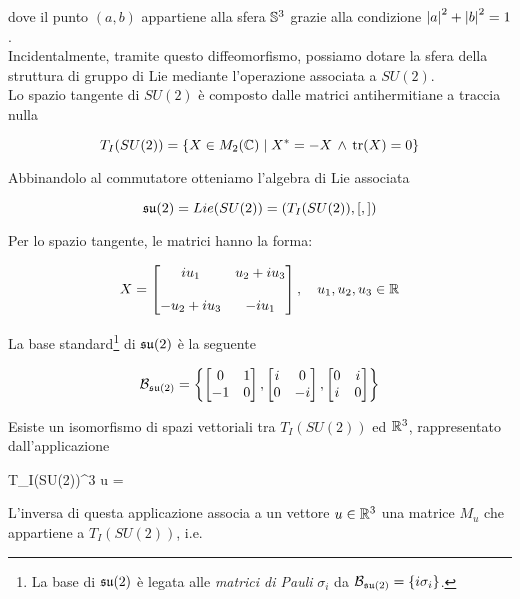 dove il punto $ (a,b) $ appartiene alla sfera $ \S^{3} $ grazie alla condizione $ \abs{a}^{2} + \abs{b}^{2} = 1 $.\\
Incidentalmente, tramite questo diffeomorfismo, possiamo dotare la sfera della struttura di gruppo di Lie mediante l'operazione associata a $ SU(2) $.\\
Lo spazio tangente di $ SU(2) $ è composto dalle matrici antihermitiane a traccia nulla

\begin{equation}
	T_{I}(SU(2)) = \{X \in M_{2}(\C) \mid X^{*} = - X \, \wedge \, \tr(X) = 0 \}
\end{equation}

Abbinandolo al commutatore otteniamo l'algebra di Lie associata

\begin{equation}
	\su(2) = Lie(SU(2)) = (T_{I}(SU(2)),[,])
\end{equation}

Per lo spazio tangente, le matrici hanno la forma:

\begin{equation}
	X = \bmqty{ %
				i u_{1} 			& u_{2} + i u_{3} \\\\
				- u_{2} + i u_{3} 	& - i u_{1} %
				} %
	\qcomma u_{1},u_{2},u_{3} \in \R
\end{equation}

La base standard\footnote{%
	La base di $ \su(2) $ è legata alle \textit{matrici di Pauli} $ \sigma_{i} $ da $ \B_{\su(2)} = \{i \sigma_{i}\} $.%
} di $ \su(2) $ è la seguente

\begin{equation}
	\B_{\su(2)} = \left\{ %
		\bmqty{ 0 & 1 \\ -1 & 0 }, %
		\bmqty{ i & 0 \\ 0 & -i }, %
		\bmqty{ 0 & i \\ i & 0 } %
		\right\}
\end{equation}

Esiste un isomorfismo di spazi vettoriali tra $ T_{I}(SU(2)) $ ed $ \R^{3} $, rappresentato dall'applicazione

\map{\psi}
	{T_{I}(SU(2))}{\R^{3}}
	{}{u = }

L'inversa di questa applicazione associa a un vettore $ u \in \R^{3} $ una matrice $ M_{u} $ che appartiene a $ T_{I}(SU(2)) $, i.e.

